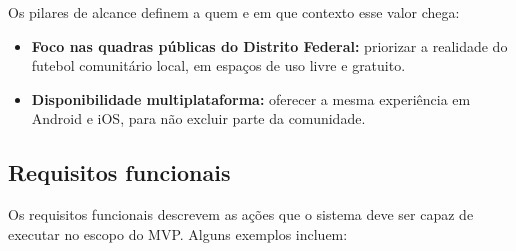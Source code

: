       Os pilares de alcance definem a quem e em que contexto esse valor chega:

      \begin{itemize}
          \item \textbf{Foco nas quadras públicas do Distrito Federal:} priorizar a realidade do futebol comunitário local, em espaços de uso livre e gratuito.

          \item \textbf{Disponibilidade multiplataforma:} oferecer a mesma experiência em Android e iOS, para não excluir parte da comunidade.
      \end{itemize}

    \subsection{Requisitos funcionais}
      Os requisitos funcionais descrevem as ações que o sistema deve ser capaz de executar no escopo do MVP. Alguns exemplos incluem:

